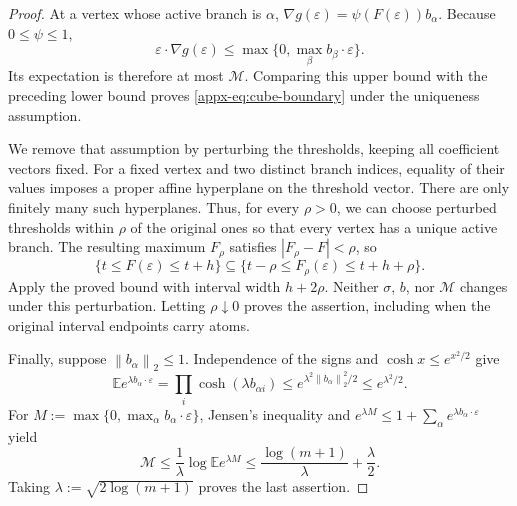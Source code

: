 \documentclass[11pt,letterpaper]{article}
\theoremstyle{remark}
\newcommand{\E}{\mathbb E}
\newcommand{\norm}[1]{\left\lVert#1\right\rVert}
\begin{document}
\begin{proof}
At a vertex whose active branch is $\alpha$,
$\nabla g(\varepsilon)=\psi(F(\varepsilon))b_\alpha$.
Because $0\le\psi\le1$,
\[
 \varepsilon\cdot\nabla g(\varepsilon)
 \le\max\{0,\max_\beta b_\beta\cdot\varepsilon\}.
\]
Its expectation is therefore at most $\mathcal M$. Comparing
this upper bound with the preceding lower bound proves
\eqref{appx-eq:cube-boundary} under the uniqueness assumption.

We remove that assumption by perturbing the thresholds, keeping all
coefficient vectors fixed. For a fixed vertex and two distinct
branch indices, equality of their values imposes a proper affine
hyperplane on the threshold vector. There are only finitely many
such hyperplanes. Thus, for every $\rho>0$, we can choose perturbed
thresholds within $\rho$ of the original ones so that every vertex
has a unique active branch. The resulting maximum $F_\rho$ satisfies
$|F_\rho-F|<\rho$, so
\[
 \{t\le F(\varepsilon)\le t+h\}
 \subseteq
 \{t-\rho\le F_\rho(\varepsilon)\le t+h+\rho\}.
\]
Apply the proved bound with interval width $h+2\rho$.
Neither $\sigma$, $b$, nor $\mathcal M$ changes under this
perturbation. Letting $\rho\downarrow0$ proves the assertion,
including when the original interval endpoints carry atoms.

Finally, suppose $\norm{b_\alpha}_2\le1$. Independence of the
signs and $\cosh x\le e^{x^2/2}$ give
\[
 \E e^{\lambda b_\alpha\cdot\varepsilon}
 =\prod_i\cosh(\lambda b_{\alpha i})
 \le e^{\lambda^2\norm{b_\alpha}_2^2/2}
 \le e^{\lambda^2/2}.
\]
For $M:=\max\{0,\max_\alpha b_\alpha\cdot\varepsilon\}$,
Jensen's inequality and $e^{\lambda M}\le
1+\sum_\alpha e^{\lambda b_\alpha\cdot\varepsilon}$ yield
\[
 \mathcal M\le\frac1\lambda\log\E e^{\lambda M}
 \le\frac{\log(m+1)}\lambda+\frac\lambda2.
\]
Taking $\lambda:=\sqrt{2\log(m+1)}$ proves the last assertion.
\end{proof}
\end{document}
